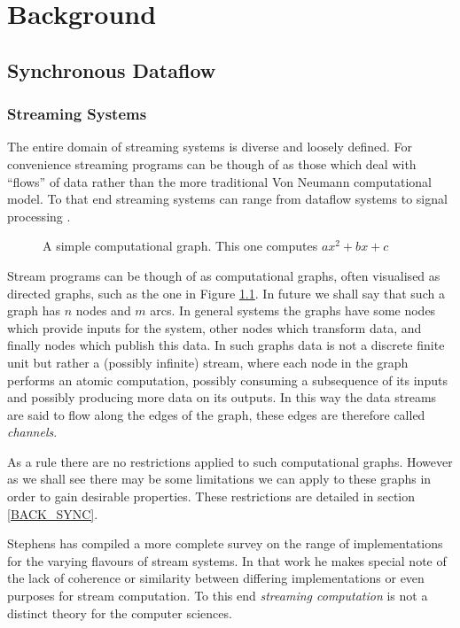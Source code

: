 \chapter{Background}
\label{chapBack}

\section{Synchronous Dataflow}

\subsection{Streaming Systems}
The entire domain of streaming systems is diverse and loosely defined.
For convenience streaming programs can be though of as those which deal with ``flows'' of data rather than the more traditional Von Neumann computational model.
To that end streaming systems can range from dataflow systems \cite{gur85} to signal processing \cite{sdfBook}.

\begin{figure}
\begin{center}
	
\caption{A simple computational graph.  This one computes $ax^2 + bx + c$}
\label{figSimpleDG}
\end{center}
\end{figure}

Stream programs can be though of as computational graphs, often visualised as directed graphs, such as the one in Figure \ref{figSimpleDG}.
In future we shall say that such a graph has $n$ nodes and $m$ arcs.
In general systems the graphs have some nodes which provide inputs for the system, other nodes which transform data, and finally nodes which publish this data.
In such graphs data is not a discrete finite unit but rather a (possibly infinite) stream, where each node in the graph performs an atomic computation, possibly consuming a subsequence of its inputs and possibly producing more data on its outputs.
In this way the data streams are said to flow along the edges of the graph, these edges are therefore called {\em channels}.

As a rule there are no restrictions applied to such computational graphs.
However as we shall see there may be some limitations we can apply to these graphs in order to gain desirable properties.
These restrictions are detailed in section \ref{BACK_SYNC}.

Stephens has compiled a more complete survey \cite{ste97} on the range of implementations for the varying flavours of stream systems.
In that work he makes special note of the lack of coherence or similarity between differing implementations or even purposes for stream computation.
To this end {\em streaming computation} is not a distinct theory for the computer sciences.

